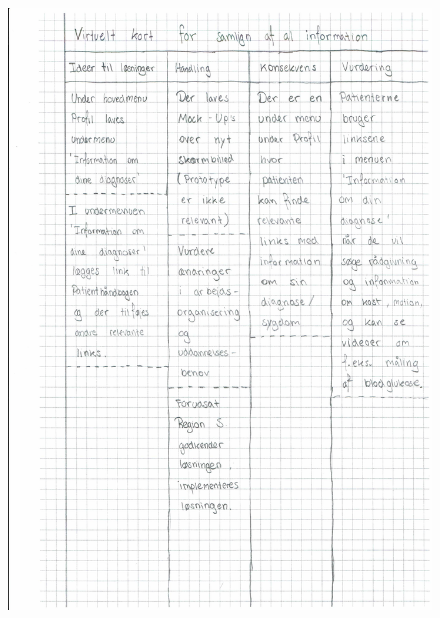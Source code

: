 \begin{figure}[H]
	\centering
	\includegraphics[angle=0, height=1.05\textheight]{Materials/DV_Kort4.pdf}
	\label{fig:DVkort4}
\end{figure}
